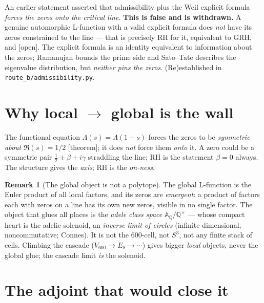 \documentclass[11pt,a4paper]{article}
\theoremstyle{definition}
\newtheorem{remark}[theorem]{Remark}
\newcommand{\Q}{\mathbb{Q}}
\newcommand{\A}{\mathbb{A}}
\newcommand{\TAGthm}{{\small\textsf{[\textcolor{green!45!black}{theorem}]}}}
\newcommand{\TAGopen}{{\small\textsf{[\textcolor{red!70!black}{open}]}}}
\begin{document}
\begin{tcolorbox}[colback=red!2,colframe=red!50!black,arc=2mm,
  title={\textbf{Withdrawn overclaim}},fonttitle=\bfseries,breakable]
An earlier statement asserted that admissibility plus the Weil explicit
formula \emph{forces the zeros onto the critical line}. \textbf{This is
false and is withdrawn.} A genuine automorphic L-function with a valid
explicit formula does \emph{not} have its zeros constrained to the line ---
that is precisely RH for it, equivalent to GRH, and \TAGopen. The explicit
formula is an identity equivalent to information about the zeros; Ramanujan
bounds the prime side and Sato--Tate describes the eigenvalue distribution,
but \emph{neither pins the zeros}. (Re)established in
\texttt{route\_b/admissibility.py}.
\end{tcolorbox}

\section{Why local $\to$ global is the wall}\label{sec:wall}

The functional equation $\Lambda(s)=\Lambda(1-s)$ forces the zeros to be
\emph{symmetric about} $\Re(s)=1/2$ \TAGthm; it does \emph{not} force them
\emph{onto} it. A zero could be a symmetric pair $\tfrac12\pm\beta+i\gamma$
straddling the line; RH is the statement $\beta=0$ always. The structure
gives the \emph{axis}; RH is the \emph{on-ness}.

\begin{remark}[The global object is not a polytope]
The global L-function is the Euler product of all local factors, and its
zeros are \emph{emergent}: a product of factors each with zeros on a line has
its own new zeros, visible in no single factor. The object that glues all
places is the \emph{adele class space} $\A_\Q/\Q^\times$ --- whose compact
heart is the adelic solenoid, an \emph{inverse limit of circles}
(infinite-dimensional, noncommutative; Connes). It is not the $600$-cell,
not $S^3$, not any finite stack of cells. Climbing the cascade
($V_{600}\to E_8\to\cdots$) gives bigger \emph{local} objects, never the
global glue; the cascade limit \emph{is} the solenoid.
\end{remark}

\section{The adjoint that would close it}\label{sec:adjoint}
\end{document}

